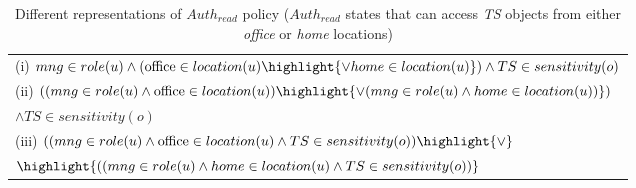 
\newcommand{\office}{\text{office}}
 
\begin{table}
	\centering
	\caption{ Different representations of  $Auth_{read}$ policy  ($Auth_{read}$ states that \textit{\manager} can access \textit{TS} objects  from either \textit{office} or \textit{home} locations)} 
	\label{tab:LAP-heterogeneity}
	\begin{tabular}{|l|}						
		\hline					
			
			(i) $  \manager \in role(u) \land (\office{} \in location(u) \highlight {\lor home \in location(u)})  \land TS \in sensitivity(o)$ \\
			(ii) $((\manager \in role(u) \land \office{} \in location(u) ) \highlight {\lor (\manager \in role(u) \land home \in location(u) )}  )$ \\ \hfill $ \land TS \in sensitivity(o)$\\
			(iii) $((\manager \in role(u) \land \office{} \in location(u) \land TS \in sensitivity(o) ) \highlight{\lor}$  \\ \hfill $\highlight{((\manager \in role(u) \land home \in location(u) \land TS \in sensitivity(o) )}$ \\
		 \hline	
	\end{tabular}	

	
\end{table}

